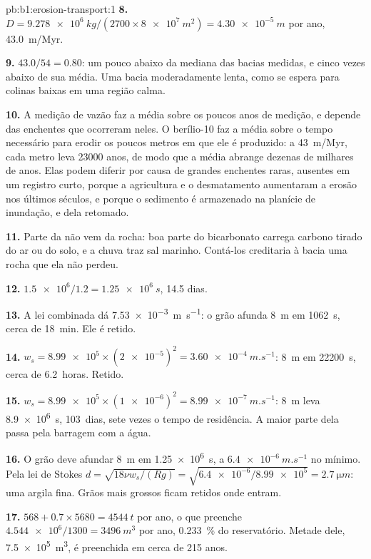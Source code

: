 \begin{solution}{pb:b1:erosion-transport:1}
\textbf{8.} $D = \qty{9.278e6}{kg}/(2700 \times \qty{8e7}{m^2}) =
\qty{4.30e-5}{m}$ por ano, \qty{43.0}{m/Myr}.

\textbf{9.} $43.0/54 = 0.80$: um pouco abaixo da mediana das bacias medidas, e cinco vezes abaixo de sua média. Uma bacia moderadamente lenta, como se espera para colinas baixas em uma região calma.

\textbf{10.} A medição de vazão faz a média sobre os poucos anos de medição, e depende das enchentes que ocorreram neles. O berílio-10 faz a média sobre o tempo necessário para erodir os poucos metros em que ele é produzido: a \qty{43}{m/Myr}, cada metro leva \num{23000} anos, de modo que a média abrange dezenas de milhares de anos. Elas podem diferir por causa de grandes enchentes raras, ausentes em um registro curto, porque a agricultura e o desmatamento aumentaram a erosão nos últimos séculos, e porque o sedimento é armazenado na planície de inundação, e dela retomado.

\textbf{11.} Parte da  não vem da rocha: boa parte do bicarbonato carrega carbono tirado do ar ou do solo, e a chuva traz sal marinho. Contá-los creditaria à bacia uma rocha que ela não perdeu.

\textbf{12.} $\num{1.5e6}/1.2 = \qty{1.25e6}{s}$, \num{14.5} dias.

\textbf{13.} A lei combinada dá \qty{7.53e-3}{m.s^{-1}}: o grão afunda \qty{8}{m} em \qty{1062}{s}, cerca de \qty{18}{min}. Ele é retido.

\textbf{14.} $w_s = \num{8.99e5} \times (\num{2e-5})^2 =
\qty{3.60e-4}{m.s^{-1}}$: \qty{8}{m} em \qty{22200}{s}, cerca de \num{6.2}~horas. Retido.

\textbf{15.} $w_s = \num{8.99e5} \times (\num{1e-6})^2 =
\qty{8.99e-7}{m.s^{-1}}$: \qty{8}{m} leva \qty{8.9e6}{s}, \num{103}~dias, sete vezes o tempo de residência. A maior parte dela passa pela barragem com a água.

\textbf{16.} O grão deve afundar \qty{8}{m} em \qty{1.25e6}{s}, a
$\qty{6.4e-6}{m.s^{-1}}$ no mínimo. Pela lei de Stokes $d = \sqrt{18\nu
w_s/(Rg)} = \sqrt{\num{6.4e-6}/\num{8.99e5}} = \qty{2.7}{\micro m}$: uma argila fina. Grãos mais grossos ficam retidos onde entram.

\textbf{17.} $568 + 0.7 \times 5680 = \qty{4544}{t}$ por ano, o que preenche
$\num{4.544e6}/1300 = \qty{3496}{m^3}$ por ano, \qty{0.233}{\percent} do
reservatório. Metade dele, \qty{7.5e5}{m^3}, é preenchida em cerca de \num{215} anos.


\end{solution}
